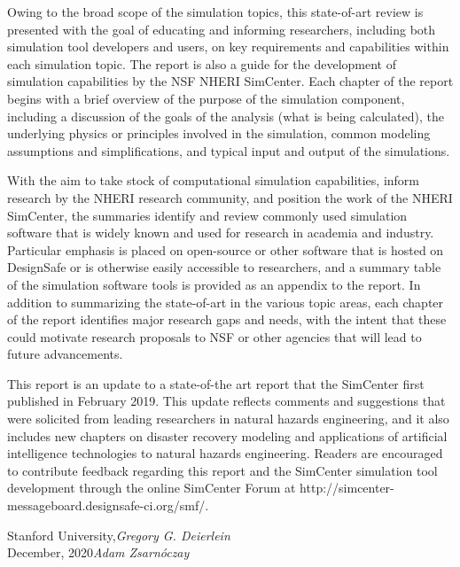 Owing to the broad scope of the simulation topics, this state-of-art review is presented with the goal of educating and informing researchers, including both simulation tool developers and users, on key requirements and capabilities within each simulation topic. The report is also a guide for the development of simulation capabilities by the NSF NHERI SimCenter. Each chapter of the report begins with a brief overview of the purpose of the simulation component, including a discussion of the goals of the analysis (what is being calculated), the underlying physics or principles involved in the simulation, common modeling assumptions and simplifications, and typical input and output of the simulations. 

With the aim to take stock of computational simulation capabilities, inform research by the NHERI research community, and position the work of the NHERI SimCenter, the summaries identify and review commonly used simulation software that is widely known and used for research in academia and industry. Particular emphasis is placed on open-source or other software that is hosted on DesignSafe or is otherwise easily accessible to researchers, and a summary table of the simulation software tools is provided as an appendix to the report. In addition to summarizing the state-of-art in the various topic areas, each chapter of the report identifies major research gaps and needs, with the intent that these could motivate research proposals to NSF or other agencies that will lead to future advancements.

This report is an update to a state-of-the art report that the SimCenter first published in February 2019.  This update reflects comments and suggestions that were solicited from leading researchers in natural hazards engineering, and it also includes new chapters on disaster recovery modeling and applications of artificial intelligence technologies to natural hazards engineering.  Readers are encouraged to contribute feedback regarding this report and the SimCenter simulation tool development through the online SimCenter Forum at http://simcenter-messageboard.designsafe-ci.org/smf/.


\vspace{\baselineskip}
\begin{flushright}\noindent
Stanford University,\hfill {\it Gregory G. Deierlein}\\
December, 2020\hfill {\it Adam Zsarnóczay}\\
\end{flushright}


